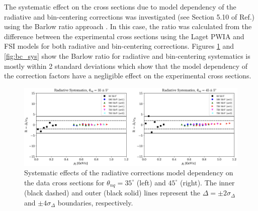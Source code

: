 \documentclass[aps, prl]{revtex4-2}  %
\begin{document}
\indent The systematic effect on the cross sections due to model dependency of the radiative and bin-centering corrections was investigated (see Section 5.10 of Ref.\cite{cyero_phdthesis})
using the Barlow ratio approach \cite{barlow2002systematic,barlow2017}. In this case, the ratio was calculated from the difference between the experimental cross
sections using the Laget PWIA and FSI models for both radiative and bin-centering corrections. Figures \ref{fig:rad_sys} and \ref{fig:bc_sys}
show the Barlow ratio for radiative and bin-centering systematics is mostly within 2 standard deviations which show that
the model dependency of the correction factors have a negligible effect on the experimental cross sections.
\begin{figure}[!h]
\includegraphics[scale=0.37]{plots/rad_sys.png}
\caption{Systematic effects of the radiative corrections model dependency on the data cross sections
  for $\theta_{nq}=35^{\circ}$ (left) and $45^{\circ}$ (right). The inner (black dashed) and outer (black solid)
  lines represent the $\Delta=\pm2\sigma_{\Delta}$ and $\pm4\sigma_{\Delta}$ boundaries, respectively.  }
\label{fig:rad_sys}
\end{figure}
\end{document}
